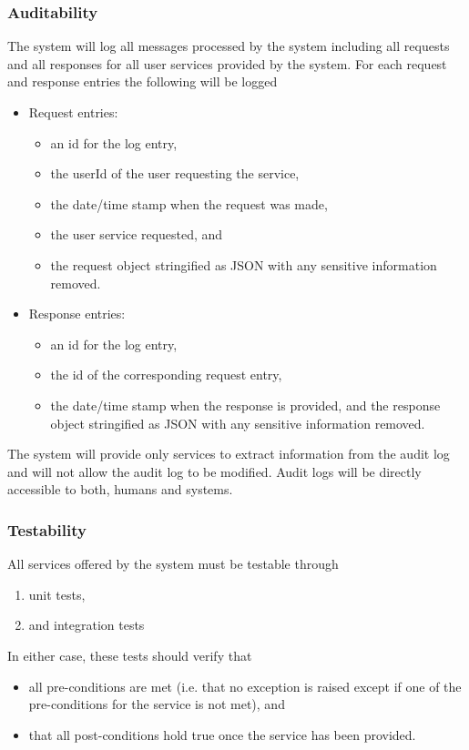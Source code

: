 \subsubsection{Auditability}
The system will log all messages processed by the system including all requests and all responses for all user services provided by the system.
For each request and response entries the following will be logged
\begin{itemize}
	\item Request entries:
	\begin{itemize}
		\item an id for the log entry,
		\item the userId of the user requesting the service,
		\item the date/time stamp when the request was made,
		\item the user service requested, and
		\item the request object stringified as JSON with any sensitive information removed.
	\end{itemize}
	
	\item Response entries:
	\begin{itemize}
		\item an id for the log entry,	
		\item the id of the corresponding request entry,
		\item the date/time stamp when the response is provided, and the response object stringified as JSON with any sensitive information removed.
	\end{itemize}
\end{itemize}
The system will provide only services to extract information from the audit log and will not allow the audit log to be modified. Audit logs will be directly accessible to both, humans and systems.

\subsubsection{Testability}
All services offered by the system must be testable through
\begin{enumerate}
\item unit tests,
\item and integration tests
\end{enumerate}

In either case, these tests should verify that
\begin{itemize}
	\item all pre-conditions are met (i.e. that no exception is raised except if one of the pre-conditions for the service is not met), and
	\item that all post-conditions hold true once the service has been provided.
\end{itemize}

